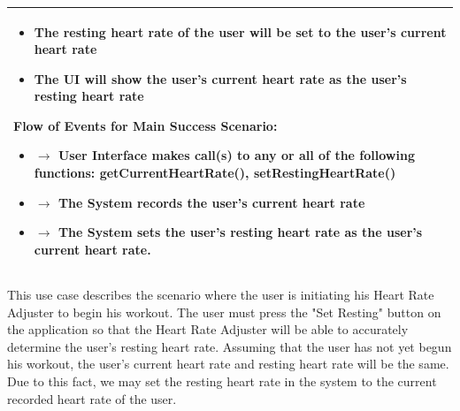 \documentclass[letterpaper,english, 12pt]{scrreprt}
\begin{document}
\begin{center}
\begin{longtable}{|C{15cm}|}
                                \begin{itemize}
                                        \item The resting heart rate of the user will be set to the user's current heart rate
					\item The UI will show the user's current heart rate as the user's resting heart rate
                                \end{itemize}
                        \begin{flushleft}
                                \textbf{Flow of Events for Main Success Scenario: }
                        \end{flushleft}
                                \begin{itemize}
                                        \item $\rightarrow$ User Interface makes call(s) to any or all of the following functions: getCurrentHeartRate(), setRestingHeartRate()
                                        \item $\rightarrow$ The System records the user's current heart rate
                                        \item $\rightarrow$ The System sets the user's resting heart rate as the user's current heart rate.
                                \end{itemize}
                       \\
                \hline
        \end{longtable}
\end{center}
This use case describes the scenario where the user is initiating his Heart Rate Adjuster to begin his workout. The user must press the "Set Resting" button on the application so that the Heart Rate Adjuster will be able to accurately determine the user's resting heart rate. Assuming that the user has not yet begun his workout, the user's current heart rate and resting heart rate will be the same. Due to this fact, we may set the resting heart rate in the system to the current recorded heart rate of the  user.
\end{document}
